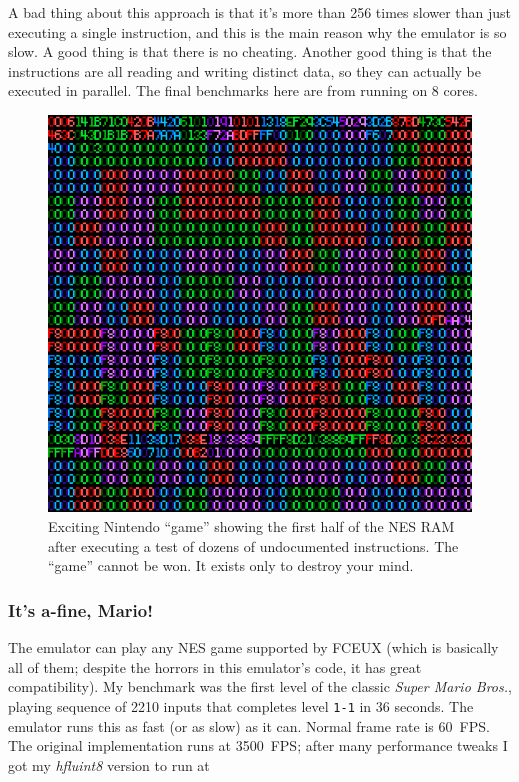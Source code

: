 \documentclass[twocolumn]{article}
\begin{document}
A bad thing about this approach is that it's more than 256 times slower
than just executing a single instruction, and this is the main reason
why the emulator is so slow. A good thing is that there is no cheating.
Another good thing is that the instructions are all reading and writing
distinct data, so they can actually be executed in parallel. The final
benchmarks here are from running on 8 cores.

\begin{figure}[htp]
  \begin{center}
    \includegraphics[width=0.9 \linewidth]{testrom}
  \end{center}
  \caption{
    Exciting Nintendo ``game'' showing the first half of the NES RAM after
    executing a test of dozens of undocumented instructions.
    The ``game'' cannot be won. It exists only to destroy your mind.
  } \label{fig:testrom}
\end{figure}

\subsubsection{It's a-fine, Mario!}

The emulator can play any NES game supported by FCEUX (which is
basically all of them; despite the horrors in this emulator's code, it
has great compatibility). My benchmark was the first level of the
classic {\it Super Mario Bros.}, playing sequence of 2210 inputs that
completes level \verb+1-1+ in 36 seconds. The emulator runs this as
fast (or as slow) as it can. Normal frame rate is 60~FPS. The original
implementation runs at 3500~FPS; after many performance tweaks I got
my {\it hfluint8} version to run at
\end{document}
